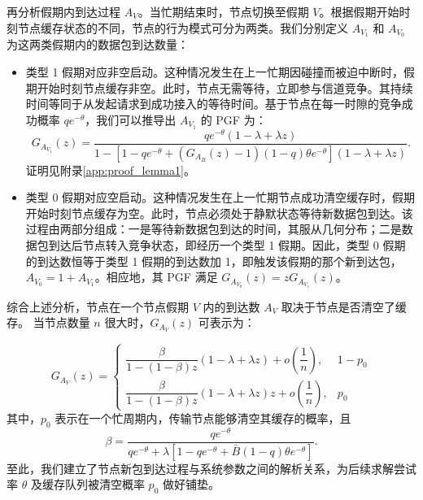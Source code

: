 再分析假期内到达过程 $A_V$。当忙期结束时，节点切换至假期 $V$。根据假期开始时刻节点缓存状态的不同，节点的行为模式可分为两类。我们分别定义 $A_{V_1}$ 和 $A_{V_0}$ 为这两类假期内的数据包到达数量：
\begin{itemize}
	\item 类型 1 假期对应非空启动。这种情况发生在上一忙期因碰撞而被迫中断时，假期开始时刻节点缓存非空。此时，节点无需等待，立即参与信道竞争。其持续时间等同于从发起请求到成功接入的等待时间。基于节点在每一时隙的竞争成功概率 $q e^{-\theta}$，我们可以推导出 $A_{V_1}$ 的 PGF 为：
	\begin{equation}
		\label{eq:G_AV1}
		G_{A_{V_1}}(z) = \frac{q e^{-\theta} (1 - \lambda + \lambda z)}{1 - [1 - q e^{-\theta} + (G_{A_B}(z) - 1)(1 - q) \theta e^{-\theta}](1 - \lambda + \lambda z)}.
	\end{equation}
	证明见附录\ref{app:proof_lemma1}。
	\item 类型 0 假期对应空启动。这种情况发生在上一忙期节点成功清空缓存时，假期开始时刻节点缓存为空。此时，节点必须处于静默状态等待新数据包到达。该过程由两部分组成：一是等待新数据包到达的时间，其服从几何分布；二是数据包到达后节点转入竞争状态，即经历一个类型 1 假期。因此，类型 0 假期的到达数恒等于类型 1 假期的到达数加 1，即触发该假期的那个新到达包，$A_{V_0} = 1 + A_{V_1}$。相应地，其 PGF 满足 $G_{A_{V_0}}(z) = z G_{A_{V_1}}(z)$。
\end{itemize}
综合上述分析，节点在一个节点假期 $V$ 内的到达数 $A_V$ 取决于节点是否清空了缓存。
当节点数量 $n$ 很大时，$ G_{A_{V}}(z) $ 可表示为：

\begin{equation}
\label{eq:G_AV_combined}
G_{A_{V}}(z) =
\begin{cases}
	\dfrac{\beta}{1-(1-\beta) z}(1-\lambda+\lambda z)+o\left(\dfrac{1}{n}\right), & 1-p_{0} \\[10pt]
	\dfrac{\beta}{1-(1-\beta) z}(1-\lambda+\lambda z)z+o\left(\dfrac{1}{n}\right), & p_{0}
\end{cases}
\end{equation}
其中，$ p_{0} $ 表示在一个忙周期内，传输节点能够清空其缓存的概率，且
\begin{equation}
\label{eq:beta_defination}
\beta = \frac{q e^{-\theta}}{q e^{-\theta}+\lambda\left[1-q e^{-\theta}+\bar{B}(1-q)\theta e^{-\theta}\right]}.
\end{equation}
至此，我们建立了节点新包到达过程与系统参数之间的解析关系，为后续求解尝试率 $\theta$ 及缓存队列被清空概率 $p_0$ 做好铺垫。

